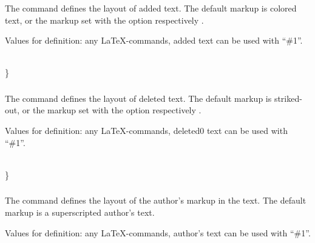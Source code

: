 The command  defines the layout of added text.
The default markup is colored text, or the markup set with the option  respectively .

Values for definition: any \LaTeX-commands, added text can be used with ``\#1''.

\begin{chusage}
		\>\\
	\usageexample
		\>\}\\
		\>
\end{chusage}


\subsubsection{}
\DescribeMacro{\setdeletedmarkup}

The command  defines the layout of deleted text.
The default markup is striked-out, or the markup set with the option  respectively .

Values for definition: any \LaTeX-commands, deleted0 text can be used with ``\#1''.

\begin{chusage}
		\>\\
	\usageexample
		\>\}\\
		\>
\end{chusage}


\subsubsection{}
\DescribeMacro{\setauthormarkup}

The command  defines the layout of the author's markup in the text.
The default markup is a superscripted author's text.

Values for definition: any \LaTeX-commands, author's text can be used with ``\#1''.

\begin{chusage}
		\>\\
	\usageexample
		\>\\
		\>\\
		\>
\end{chusage}


